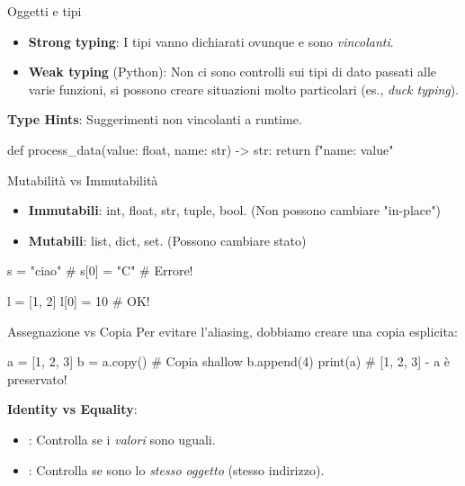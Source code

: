 \documentclass[12pt,aspectratio=169,notheorems]{beamer}
\begin{document}
\begin{frame}[fragile]{Oggetti e tipi}
    \begin{itemize}
        \item \textbf{Strong typing}: I tipi vanno dichiarati ovunque e sono \textit{vincolanti}.
        \item \textbf{Weak typing} (Python): Non ci sono controlli sui tipi di dato passati alle varie funzioni, si possono creare situazioni molto particolari (es., \textit{duck typing}).
    \end{itemize}
    \textbf{Type Hints}: Suggerimenti non vincolanti a runtime.
    \begin{python}
        def process_data(value: float, name: str) -> str:
            return f"{name}: {value}"
    \end{python}
\end{frame}

\begin{frame}[fragile]{Mutabilità vs Immutabilità}
    \begin{itemize}
        \item \textbf{Immutabili}: int, float, str, tuple, bool. (Non possono cambiare "in-place")
        \item \textbf{Mutabili}: list, dict, set. (Possono cambiare stato)
    \end{itemize}
    \begin{python}
        s = "ciao"
        # s[0] = "C" # Errore!

        l = [1, 2]
        l[0] = 10    # OK!
    \end{python}
\end{frame}

\begin{frame}[fragile]{Assegnazione vs Copia}
    Per evitare l'aliasing, dobbiamo creare una copia esplicita:
    \begin{python}
        a = [1, 2, 3]
        b = a.copy() # Copia shallow
        b.append(4)
        print(a) # [1, 2, 3] - a è preservato!
    \end{python}
    \vfill
    \textbf{Identity vs Equality}:
    \begin{itemize}
        \item {}: Controlla se i \textit{valori} sono uguali.
        \item {}: Controlla se sono lo \textit{stesso oggetto} (stesso indirizzo).
    \end{itemize}
\end{frame}
\end{document}
